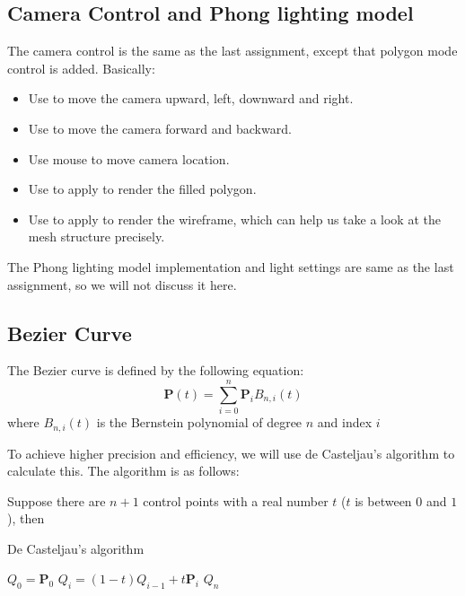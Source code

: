 \documentclass[acmtog]{acmart}
\newcommand{\code}[1]{\texttt{\color{magenta}{#1}}} %
\begin{document}
\subsection{Camera Control and Phong lighting model}

The camera control is the same as the last assignment, except that polygon mode control is added. Basically: 

\begin{itemize}
	\item Use \code{WASD} to move the camera upward, left, downward and right.
	\item Use \code{RF} to move the camera forward and backward.
	\item Use mouse to move camera location.
	\item Use \code{O} to apply \code{glPolygonMode  GL\_FILL} to render the filled polygon.
	\item Use \code{P} to apply \code{glPolygonMode GL\_LINE} to render the wireframe, which can help us take a look at the mesh structure precisely.
\end{itemize}

The Phong lighting model implementation and light settings are same as the last assignment, so we will not discuss it here.

\subsection{Bezier Curve}
The Bezier curve is defined by the following equation:
\begin{equation}
\bm{P}(t) = \sum_{i=0}^{n} \bm{P}_i B_{n,i}(t)
\end{equation}
where $B_{n,i}(t)$ is the Bernstein polynomial of degree $n$ and index $i$

To achieve higher precision and efficiency, we will use de Casteljau's algorithm to calculate this. The algorithm is as follows:

Suppose there are $n+1$ control points with a real number $t$ ($t$ is between $0$ and $1$), then 

\begin{algorithm}
	\caption{De Casteljau's algorithm}
	\begin{algorithmic}[1]
		\State $Q_0 = \bm{P}_0$
		\State $Q_i = (1-t)Q_{i-1} + t\bm{P}_i$
		\EndFor
		\State \Return $Q_n$
		\EndProcedure
	\end{algorithmic}
\end{algorithm}
\end{document}
